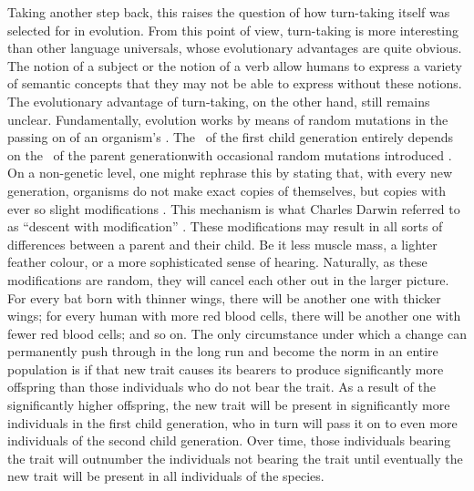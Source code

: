 Taking another step back, this raises the question of how turn-taking itself was selected for in evolution.
From this point of view, turn-taking is more interesting than other language universals, whose evolutionary advantages are quite obvious.
The notion of a subject or the notion of a verb \citep[both considered language universals,][]{robins_noun_1952,hopper_iconicity_1985} allow humans to express a variety of semantic concepts that they may not be able to express without these notions.
The evolutionary advantage of turn-taking, on the other hand, still remains unclear.
Fundamentally, evolution works by means of random mutations in the passing on of an organism's \dna.
The \dna\ of the first child generation entirely depends on the \dna\ of the parent generation\dash with occasional random mutations introduced \citep[]{dediu_introduction_2015}.
On a non-genetic level, one might rephrase this by stating that, with every new generation, organisms do not make exact copies of themselves, but copies with ever so slight modifications \citep[]{dediu_introduction_2015}.
This mechanism is what Charles Darwin referred to as ``descent with modification'' \citep[]{darwin_origin_1958}.
These modifications may result in all sorts of differences between a parent and their child.
Be it less muscle mass, a lighter feather colour, or a more sophisticated sense of hearing.
Naturally, as these modifications are random, they will cancel each other out in the larger picture.
For every bat born with thinner wings, there will be another one with thicker wings; for every human with more red blood cells, there will be another one with fewer red blood cells; and so on.
The only circumstance under which a change can permanently push through in the long run and become the norm in an entire population is if that new trait causes its bearers to produce significantly more offspring than those individuals who do not bear the trait.
As a result of the significantly higher offspring, the new trait will be present in significantly more individuals in the first child generation, who in turn will pass it on to even more individuals of the second child generation.
Over time, those individuals bearing the trait will outnumber the individuals not bearing the trait until eventually the new trait will be present in all individuals of the species.%
